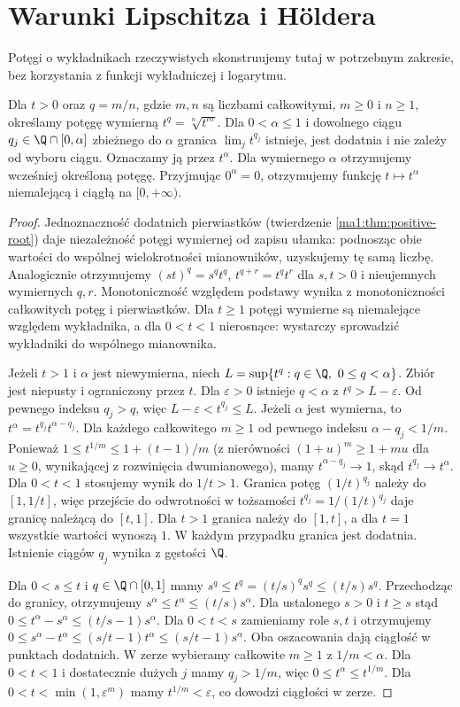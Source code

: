 \section{Warunki Lipschitza i H\"oldera}

Potęgi o wykładnikach rzeczywistych skonstruujemy tutaj w potrzebnym zakresie, bez korzystania z funkcji wykładniczej i logarytmu.

\begin{lemat}
\label{ma1:lem:holder-powers}
Dla $t>0$ oraz $q=m/n$, gdzie $m,n$ są liczbami całkowitymi, $m\ge0$ i $n\ge1$, określamy potęgę wymierną $t^q=\sqrt[n]{t^m}$. Dla $0<\alpha\le1$ i dowolnego ciągu $q_j\in\Q\cap[0,\alpha]$ zbieżnego do $\alpha$ granica $\lim_j t^{q_j}$ istnieje, jest dodatnia i nie zależy od wyboru ciągu. Oznaczamy ją przez $t^\alpha$. Dla wymiernego $\alpha$ otrzymujemy wcześniej określoną potęgę. Przyjmując $0^\alpha=0$, otrzymujemy funkcję $t\mapsto t^\alpha$ niemalejącą i ciągłą na $[0,+\infty)$.
\end{lemat}
\begin{proof}
Jednoznaczność dodatnich pierwiastków (twierdzenie \ref{ma1:thm:positive-root}) daje niezależność potęgi wymiernej od zapisu ułamka: podnosząc obie wartości do wspólnej wielokrotności mianowników, uzyskujemy tę samą liczbę. Analogicznie otrzymujemy $(st)^q=s^qt^q$, $t^{q+r}=t^qt^r$ dla $s,t>0$ i nieujemnych wymiernych $q,r$. Monotoniczność względem podstawy wynika z monotoniczności całkowitych potęg i pierwiastków. Dla $t\ge1$ potęgi wymierne są niemalejące względem wykładnika, a dla $0<t<1$ nierosnące: wystarczy sprowadzić wykładniki do wspólnego mianownika.

Jeżeli $t>1$ i $\alpha$ jest niewymierna, niech $L=\sup\{t^q:q\in\Q,\ 0\le q<\alpha\}$. Zbiór jest niepusty i ograniczony przez $t$. Dla $\varepsilon>0$ istnieje $q<\alpha$ z $t^q>L-\varepsilon$. Od pewnego indeksu $q_j>q$, więc $L-\varepsilon<t^{q_j}\le L$. Jeżeli $\alpha$ jest wymierna, to $t^\alpha=t^{q_j}t^{\alpha-q_j}$. Dla każdego całkowitego $m\ge1$ od pewnego indeksu $\alpha-q_j<1/m$. Ponieważ $1\le t^{1/m}\le1+(t-1)/m$ (z nierówności $(1+u)^m\ge1+mu$ dla $u\ge0$, wynikającej z rozwinięcia dwumianowego), mamy $t^{\alpha-q_j}\to1$, skąd $t^{q_j}\to t^\alpha$. Dla $0<t<1$ stosujemy wynik do $1/t>1$. Granica potęg $(1/t)^{q_j}$ należy do $[1,1/t]$, więc przejście do odwrotności w tożsamości $t^{q_j}=1/(1/t)^{q_j}$ daje granicę należącą do $[t,1]$. Dla $t>1$ granica należy do $[1,t]$, a dla $t=1$ wszystkie wartości wynoszą $1$. W każdym przypadku granica jest dodatnia. Istnienie ciągów $q_j$ wynika z gęstości $\Q$.

Dla $0<s\le t$ i $q\in\Q\cap[0,1]$ mamy $s^q\le t^q=(t/s)^q s^q\le(t/s)s^q$. Przechodząc do granicy, otrzymujemy $s^\alpha\le t^\alpha\le(t/s)s^\alpha$. Dla ustalonego $s>0$ i $t\ge s$ stąd $0\le t^\alpha-s^\alpha\le(t/s-1)s^\alpha$. Dla $0<t<s$ zamieniamy role $s,t$ i otrzymujemy $0\le s^\alpha-t^\alpha\le(s/t-1)t^\alpha\le(s/t-1)s^\alpha$. Oba oszacowania dają ciągłość w punktach dodatnich. W zerze wybieramy całkowite $m\ge1$ z $1/m<\alpha$. Dla $0<t<1$ i dostatecznie dużych $j$ mamy $q_j>1/m$, więc $0\le t^\alpha\le t^{1/m}$. Dla $0<t<\min(1,\varepsilon^m)$ mamy $t^{1/m}<\varepsilon$, co dowodzi ciągłości w zerze.
\end{proof}

